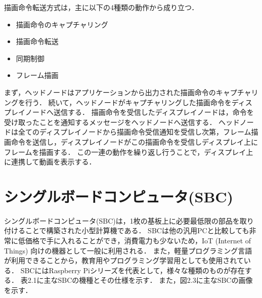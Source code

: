 描画命令転送方式は，主に以下の4種類の動作から成り立つ．

\begin{itemize}
    \item 描画命令のキャプチャリング
    \item 描画命令転送
    \item 同期制御
    \item フレーム描画
\end{itemize}

  まず，ヘッドノードはアプリケーションから出力された描画命令のキャプチャリングを行う．
  続いて，ヘッドノードがキャプチャリングした描画命令をディスプレイノードへ送信する．
  描画命令を受信したディスプレイノードは，命令を受け取ったことを通知するメッセージをヘッドノードへ送信する．
  ヘッドノードは全てのディスプレイノードから描画命令受信通知を受信し次第，フレーム描画命令を送信し，ディスプレイノードがこの描画命令を受信しディスプレイ上にフレームを描画する．
  この一連の動作を繰り返し行うことで，ディスプレイ上に連携して動画を表示する．

\section*{シングルボードコンピュータ(SBC)}

シングルボードコンピュータ(SBC)は，1枚の基板上に必要最低限の部品を取り付けることで構築された小型計算機である．
SBCは他の汎用PCと比較しても非常に低価格で手に入れることができ，消費電力も少ないため，IoT (Internet of Things) 向けの機器として一般に利用される\cite{130007722836,7380571}．
また，軽量プログラミング言語が利用できることから，教育用やプログラミング学習用としても使用されている．
SBCにはRaspberry Piシリーズを代表として，様々な種類のものが存在する．
表2.1に主なSBCの機種とその仕様を示す．
また，図2.3に主なSBCの画像を示す．

